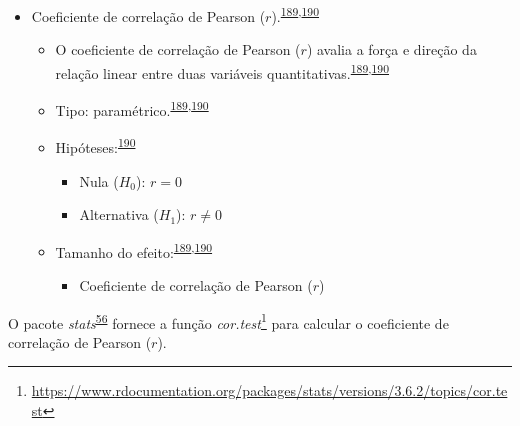 \documentclass[
  a4paper,
]{book}
\providecommand{\tightlist}{%
  \setlength{\itemsep}{0pt}\setlength{\parskip}{0pt}}
\renewcommand{\href}[2]{#2\footnote{\url{#1}}}
\newenvironment{infobox}[1]
  {
  \begin{itemize}
  \renewcommand{\labelitemi}{
    \raisebox{-.7\height}[0pt][0pt]{
      {\setkeys{Gin}{width=3em,keepaspectratio}
        \texttt{[image: \#1]}}
    }
  }
  \setlength{\fboxsep}{1em}
  \begin{blackbox}
  \item
  }
  {
  \end{blackbox}
  \end{itemize}
  }
\begin{document}
\begin{itemize}
\item
  Coeficiente de correlação de Pearson (\(r\)).\textsuperscript{\protect\hyperlink{ref-khamis2008}{189},\protect\hyperlink{ref-allison2022}{190}}

  \begin{itemize}
  \item
    O coeficiente de correlação de Pearson (\(r\)) avalia a força e direção da relação linear entre duas variáveis quantitativas.\textsuperscript{\protect\hyperlink{ref-khamis2008}{189},\protect\hyperlink{ref-allison2022}{190}}
  \item
    Tipo: paramétrico.\textsuperscript{\protect\hyperlink{ref-khamis2008}{189},\protect\hyperlink{ref-allison2022}{190}}
  \item
    Hipóteses:\textsuperscript{\protect\hyperlink{ref-allison2022}{190}}

    \begin{itemize}
    \item
      Nula (\(H_{0}\)): \(r=0\)
    \item
      Alternativa (\(H_{1}\)): \(r≠0\)
    \end{itemize}
  \item
    Tamanho do efeito:\textsuperscript{\protect\hyperlink{ref-khamis2008}{189},\protect\hyperlink{ref-allison2022}{190}}

    \begin{itemize}
    \tightlist
    \item
      Coeficiente de correlação de Pearson (\(r\))
    \end{itemize}
  \end{itemize}
\end{itemize}

\begin{infobox}{images/Rlogo}
O pacote \emph{stats}\textsuperscript{\protect\hyperlink{ref-stats-2}{56}} fornece a função \href{https://www.rdocumentation.org/packages/stats/versions/3.6.2/topics/cor.test}{\emph{cor.test}} para calcular o coeficiente de correlação de Pearson (\(r\)).

\end{infobox}
\end{document}
